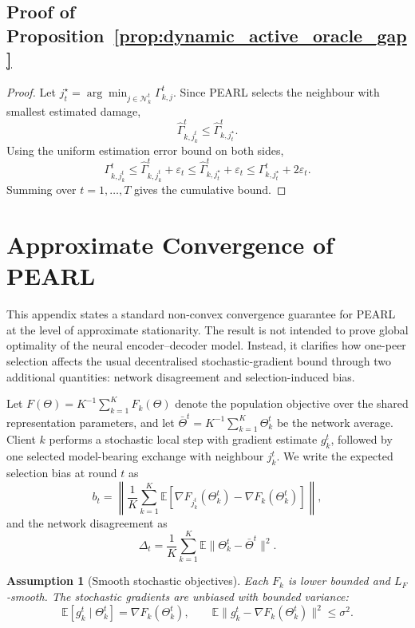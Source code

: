 \documentclass[conference]{IEEEtran}
\newtheorem{assumption}{Assumption}
\begin{document}
\subsection{Proof of Proposition~\ref{prop:dynamic_active_oracle_gap}}
\begin{proof}
Let \(j^\star_t=\arg\min_{j\in\mathcal{N}_k^t}\Gamma_{k,j}^t\). Since PEARL selects the neighbour with smallest estimated damage,
\[
\widehat{\Gamma}_{k,j_k^t}^t
\leq
\widehat{\Gamma}_{k,j^\star_t}^t .
\]
Using the uniform estimation error bound on both sides,
\[
\Gamma_{k,j_k^t}^t
\leq
\widehat{\Gamma}_{k,j_k^t}^t+\varepsilon_t
\leq
\widehat{\Gamma}_{k,j^\star_t}^t+\varepsilon_t
\leq
\Gamma_{k,j^\star_t}^t+2\varepsilon_t .
\]
Summing over \(t=1,\ldots,T\) gives the cumulative bound.
\end{proof}

\section{Approximate Convergence of PEARL}
\label{app:convergence}

This appendix states a standard non-convex convergence guarantee for PEARL at the level of approximate stationarity. The result is not intended to prove global optimality of the neural encoder--decoder model. Instead, it clarifies how one-peer selection affects the usual decentralised stochastic-gradient bound through two additional quantities: network disagreement and selection-induced bias.

Let \(F(\Theta)=K^{-1}\sum_{k=1}^{K}F_k(\Theta)\) denote the population objective over the shared representation parameters, and let \(\bar{\Theta}^{t}=K^{-1}\sum_{k=1}^{K}\Theta_k^t\) be the network average. Client \(k\) performs a stochastic local step with gradient estimate \(g_k^t\), followed by one selected model-bearing exchange with neighbour \(j_k^t\). We write the expected selection bias at round \(t\) as
\begin{equation*}
    b_t
    =
    \left\|
    \frac{1}{K}\sum_{k=1}^{K}
    \mathbb{E}\!\left[
    \nabla F_{j_k^t}(\Theta_k^t)
    -
    \nabla F_k(\Theta_k^t)
    \right]
    \right\|,
\end{equation*}
and the network disagreement as
\begin{equation*}
    \Delta_t
    =
    \frac{1}{K}\sum_{k=1}^{K}
    \mathbb{E}\|\Theta_k^t-\bar{\Theta}^t\|^2 .
\end{equation*}

\begin{assumption}[Smooth stochastic objectives]
\label{ass:appendix_smooth}
Each \(F_k\) is lower bounded and \(L_F\)-smooth. The stochastic gradients are unbiased with bounded variance:
\begin{equation*}
    \mathbb{E}[g_k^t\mid\Theta_k^t]=\nabla F_k(\Theta_k^t),
    \qquad
    \mathbb{E}\|g_k^t-\nabla F_k(\Theta_k^t)\|^2\leq\sigma^2 .
\end{equation*}
\end{assumption}
\end{document}
